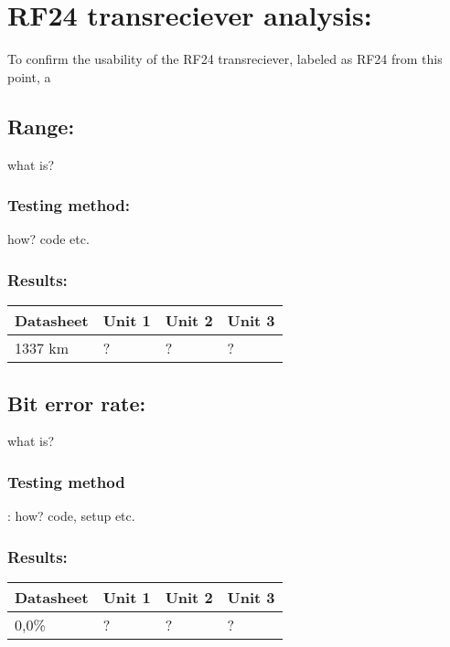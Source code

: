 \documentclass{report}
\begin{document}
\chapter{RF24 transreciever analysis:}
To confirm the usability of the RF24 transreciever, labeled as RF24 from this point, a
\section{Range:}
what is?

\subsection{Testing method:}
how? code etc.

\subsection{Results:}
\begin{table}[!h]
\begin{tabular}{|l|l|l|l|} \hline
	Datasheet 	& Unit 1 	& Unit 2 	& Unit 3 	\\\hline
	1337 km 	& ? 		& ? 		& ? 		\\\hline
\end{tabular}
\end{table}

\section{Bit error rate:}
what is?

\subsection{Testing method}:
how? code, setup etc.

\subsection{Results:}
\begin{table}[!h]
\begin{tabular}{|l|l|l|l|} \hline
	Datasheet 	& Unit 1 	& Unit 2 	& Unit 3 	\\\hline
	0,0\% 		& ? 		& ? 		& ? 		\\\hline
\end{tabular}
\end{table}
\end{document}
